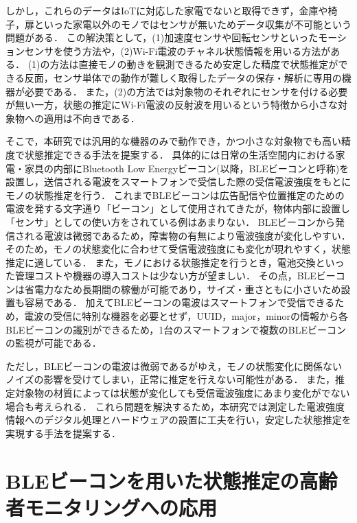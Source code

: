 
しかし，これらのデータはIoTに対応した家電でないと取得できず，金庫や椅子，扉といった家電以外のモノではセンサが無いためデータ収集が不可能という問題がある．
この解決策として，(1)加速度センサや回転センサといったモーションセンサを使う方法や，(2)Wi-Fi電波のチャネル状態情報を用いる方法がある．
(1)の方法は直接モノの動きを観測できるため安定した精度で状態推定ができる反面，センサ単体での動作が難しく取得したデータの保存・解析に専用の機器が必要である．
また，(2)の方法では対象物のそれぞれにセンサを付ける必要が無い一方，状態の推定にWi-Fi電波の反射波を用いるという特徴から小さな対象物への適用は不向きである．

そこで，本研究では汎用的な機器のみで動作でき，かつ小さな対象物でも高い精度で状態推定できる手法を提案する．
具体的には日常の生活空間内における家電・家具の内部にBluetooth Low Energyビーコン(以降，BLEビーコンと呼称)を設置し，送信される電波をスマートフォンで受信した際の受信電波強度をもとにモノの状態推定を行う．
これまでBLEビーコンは広告配信や位置推定のための電波を発する文字通り「ビーコン」として使用されてきたが，物体内部に設置し「センサ」としての使い方をされている例はあまりない．
BLEビーコンから発信される電波は微弱であるため，障害物の有無により電波強度が変化しやすい．
そのため，モノの状態変化に合わせて受信電波強度にも変化が現れやすく，状態推定に適している．
また，モノにおける状態推定を行うとき，電池交換といった管理コストや機器の導入コストは少ない方が望ましい．
その点，BLEビーコンは省電力なため長期間の稼働が可能であり，サイズ・重さともに小さいため設置も容易である．
加えてBLEビーコンの電波はスマートフォンで受信できるため，電波の受信に特別な機器を必要とせず，UUID，major，minorの情報から各BLEビーコンの識別ができるため，1台のスマートフォンで複数のBLEビーコンの監視が可能である．

ただし，BLEビーコンの電波は微弱であるがゆえ，モノの状態変化に関係ないノイズの影響を受けてしまい，正常に推定を行えない可能性がある．
また，推定対象物の材質によっては状態が変化しても受信電波強度にあまり変化がでない場合も考えられる．
これら問題を解決するため，本研究では測定した電波強度情報へのデジタル処理とハードウェアの設置に工夫を行い，安定した状態推定を実現する手法を提案する．


\section{BLEビーコンを用いた状態推定の高齢者モニタリングへの応用}
\label{sec:example}

